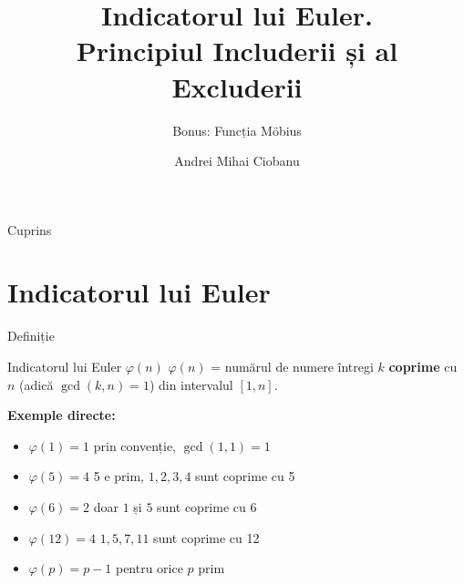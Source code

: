 \documentclass[10pt]{beamer}
\title{Indicatorul lui Euler.\\Principiul Includerii și al Excluderii}
\subtitle{Bonus: Funcția Möbius}
\author{Andrei Mihai Ciobanu}
\institute{Algolymp Summer School}
\date{}
\begin{document}
\begin{frame}
  \titlepage
\end{frame}

\begin{frame}{Cuprins}
  \tableofcontents
\end{frame}

\section{Indicatorul lui Euler}

\begin{frame}{Definiție}
  \begin{block}{Indicatorul lui Euler \textemdash{} $\varphi(n)$}
    $\varphi(n)$ = numărul de numere întregi $k$ \textbf{coprime} cu $n$ (adică $\gcd(k, n) = 1$) din intervalul $[1, n]$.
  \end{block}
  \smallskip
  \textbf{Exemple directe:}
  \begin{itemize}\itemsep2pt
    \item $\varphi(1) = 1$ \textemdash{} prin convenție, $\gcd(1,1)=1$
    \item $\varphi(5) = 4$ \textemdash{} 5 e prim, $1, 2, 3, 4$ sunt coprime cu 5
    \item $\varphi(6) = 2$ \textemdash{} doar $1$ și $5$ sunt coprime cu 6
    \item $\varphi(12) = 4$ \textemdash{} $1, 5, 7, 11$ sunt coprime cu 12
    \item $\varphi(p) = p-1$ pentru orice $p$ prim
  \end{itemize}
\end{frame}
\end{document}
